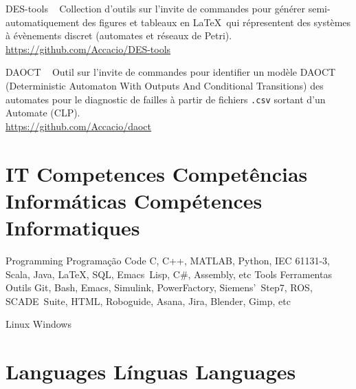 {DES-tools}
{}
{}{}{
  {~}
  {
  Collection d'outils sur l'invite de commandes pour générer semi-automatiquement des figures et tableaux en \LaTeX\ qui répresentent des systèmes à évènements discret (automates et réseaux de Petri).
  }
  \\\url{https://github.com/Accacio/DES-tools}
}

{DAOCT}
{}
{}{}{
  {~}
  {
  Outil sur l'invite de commandes pour identifier un modèle DAOCT (Deterministic Automaton With Outputs And Conditional Transitions) des automates pour le diagnostic de failles à partir de fichiers \texttt{.csv} sortant d'un Automate (CLP).}
  \\\url{https://github.com/Accacio/daoct}}

\section{
  \ml
  {IT Competences}
  {Competências Informáticas}
  {Compétences Informatiques}
}
\cvcomputer
{\ml
  {Programming}
  {Programação}
  {Code}
  }{
  C,
  C++,
  MATLAB,
  Python,
  IEC 61131-3,
  Scala,
  Java,
  \LaTeX,
  SQL,
  Emacs~Lisp,
  C\#,
  Assembly,
  etc
}
{\ml
  {Tools}
  {Ferramentas}
  {Outils}
}
{
  Git,
  Bash,
  Emacs,
  Simulink,
  PowerFactory,
  Siemens'~Step7,
  ROS,
  SCADE~Suite,
  HTML,
  Roboguide,
  Asana,
  Jira,
  Blender,
  Gimp,
  etc
}

{Linux  Windows
}
{}{}

\section{
  \ml
  {Languages}
  {Línguas}
  {Languages}
}
\newcommand{\razText}{\ml{Functional}{Razoavelmente}{Décemment}}
\newcommand{\bemText}{\ml{Fluent}{Bem}{Bien}}
\newcommand{\poucoText}{\ml{Basic}{Pouco}{Peu}}
\newcommand{\nativoText}{\ml{Native}{Nativo}{Natif}}

